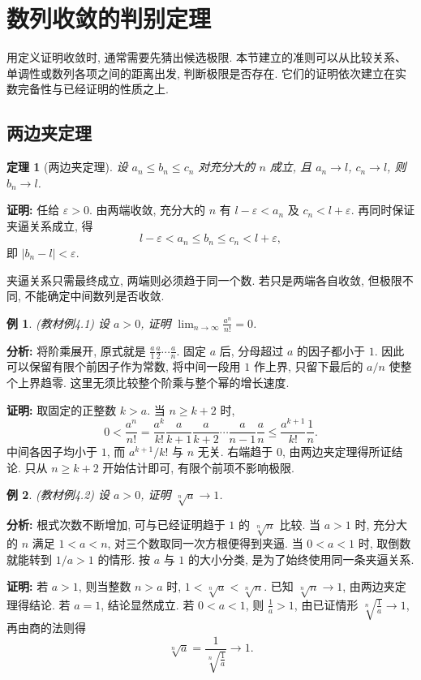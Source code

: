 \documentclass[UTF8,openany]{ctexbook}
\theoremstyle{chinesetextbook}
\newtheorem{example}{例}[section]
\newtheorem{theorem}{定理}[section]
\newenvironment{cnproof}{\par\indent\textbf{证明:} \ignorespaces}{\par}
\begin{document}
\section{数列收敛的判别定理}
用定义证明收敛时, 通常需要先猜出候选极限. 本节建立的准则可以从比较关系、单调性或数列各项之间的距离出发, 判断极限是否存在. 它们的证明依次建立在实数完备性与已经证明的性质之上.
\subsection{两边夹定理}
\begin{theorem}[两边夹定理]
设 $a_n\le b_n\le c_n$ 对充分大的 $n$ 成立, 且 $a_n\to l$, $c_n\to l$, 则 $b_n\to l$.
\end{theorem}
\begin{cnproof}
任给 $\varepsilon>0$. 由两端收敛, 充分大的 $n$ 有 $l-\varepsilon<a_n$ 及 $c_n<l+\varepsilon$. 再同时保证夹逼关系成立, 得
\[
l-\varepsilon<a_n\le b_n\le c_n<l+\varepsilon,
\]
即 $|b_n-l|<\varepsilon$.
\end{cnproof}
夹逼关系只需最终成立, 两端则必须趋于同一个数. 若只是两端各自收敛, 但极限不同, 不能确定中间数列是否收敛.
\begin{example}
(教材例4.1) 设 $a>0$, 证明 $\displaystyle \lim_{n\to\infty}\frac{a^n}{n!}=0$.
\end{example}
\par\indent\textbf{分析:} 将阶乘展开, 原式就是 $\displaystyle\frac a1\frac a2\cdots\frac an$. 固定 $a$ 后, 分母超过 $a$ 的因子都小于 $1$. 因此可以保留有限个前因子作为常数, 将中间一段用 $1$ 作上界, 只留下最后的 $a/n$ 使整个上界趋零. 这里无须比较整个阶乘与整个幂的增长速度.
\begin{cnproof}
取固定的正整数 $k>a$. 当 $n\ge k+2$ 时,
\[
0<\frac{a^n}{n!}
=\frac{a^k}{k!}\frac a{k+1}\frac a{k+2}\cdots\frac a{n-1}\frac an
\le\frac{a^{k+1}}{k!}\frac1n.
\]
中间各因子均小于 $1$, 而 $a^{k+1}/k!$ 与 $n$ 无关. 右端趋于 $0$, 由两边夹定理得所证结论. 只从 $n\ge k+2$ 开始估计即可, 有限个前项不影响极限.
\end{cnproof}
\begin{example}
(教材例4.2) 设 $a>0$, 证明 $\sqrt[n]{a}\to1$.
\end{example}
\par\indent\textbf{分析:} 根式次数不断增加, 可与已经证明趋于 $1$ 的 $\sqrt[n]n$ 比较. 当 $a>1$ 时, 充分大的 $n$ 满足 $1<a<n$, 对三个数取同一次方根便得到夹逼. 当 $0<a<1$ 时, 取倒数就能转到 $1/a>1$ 的情形. 按 $a$ 与 $1$ 的大小分类, 是为了始终使用同一条夹逼关系.
\begin{cnproof}
若 $a>1$, 则当整数 $n>a$ 时, $1<\sqrt[n]a<\sqrt[n]n$. 已知 $\sqrt[n]n\to1$, 由两边夹定理得结论. 若 $a=1$, 结论显然成立. 若 $0<a<1$, 则 $\displaystyle \frac1a>1$, 由已证情形 $\displaystyle \sqrt[n]{\frac1a}\to1$, 再由商的法则得
\[
\sqrt[n]a=\frac1{\sqrt[n]{\frac1a}}\longrightarrow1.
\]
\end{cnproof}
\end{document}
